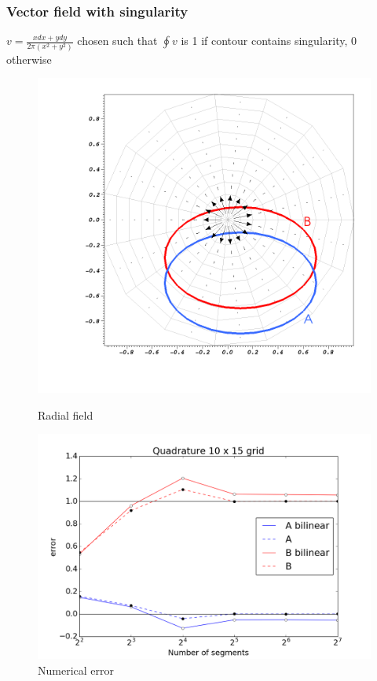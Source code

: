 \documentclass[aspectratio=169]{beamer}
\begin{document}
\begin{frame}[t]
  \frametitle{Vector field with singularity}
  \begin{block}{}
   $v = \frac{x dx + y dy}{2 \pi (x^2 + y^2)}$ chosen such that 
  $\oint v$ is 1 if contour contains singularity, 0 otherwise
  \end{block}
  
\begin{figure}[!htb]
\centering
\begin{minipage}{.49\textwidth}
  \centering
  \includegraphics[width=.8\linewidth]{polar.png}
  \caption{Radial field}
\end{minipage}%
\begin{minipage}{.49\textwidth}
  \centering
  \includegraphics[width=.98\linewidth]{case2ErrorPlotAB.png}
  \caption{Numerical error}
\end{minipage}
\end{figure}
\end{frame}
\end{document}
